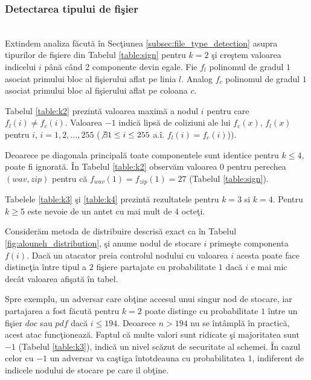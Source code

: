 \documentclass{llncs}
\begin{document}
\subsubsection{Detectarea tipului de fi\c{s}ier}\hspace*{\fill} \\

Extindem analiza f\u{a}cut\u{a} \^{i}n Sec\c{t}iunea {\ref{subsec:file_type_detection}} asupra tipurilor de fi\c{s}iere din Tabelul {\ref{table:sign}} pentru $k = 2$ \c{s}i cre\c{s}tem valoarea indicelui $i$ p\^{a}n\u{a} c\^{a}nd 2 componente devin egale. Fie $f_l$ polinomul de gradul $1$ asociat primului bloc al fi\c{s}ierului aflat pe linia $l$. Analog $f_c$ polinomul de gradul $1$ asociat primului bloc al fi\c{s}ierului aflat pe coloana $c$.

Tabelul {\ref{table:k2} prezint\u{a}} valoarea maxim\u{a} a nodul $i$ pentru care $f_l(i) \neq f_c(i)$. Valoarea $-1$ indic\u{a} lips\u{a} de coliziuni ale lui $f_c(x)$, $f_l(x)$ pentru $i$, $i = {1,2,\dots,255}$ ($\not\exists 1 \leq i \leq 255$ a.\^{i}. $f_l(i) = f_c(i)$)).

Deoarece pe diagonala principal\u{a} toate componentele sunt identice pentru $k \leq 4$, poate fi ignorat\u{a}. \^{I}n Tabelul {\ref{table:k2}} observ\u{a}m valoarea $0$ pentru perechea $(wav, zip)$ pentru c\u{a} $f_{wav}(1) = f_{zip}(1) = 27$ (Tabelul \ref{table:sign}).

Tabelele {\ref{table:k3} \c{s}i \ref{table:k4}} prezint\u{a} rezultatele pentru $k = 3$ si $k = 4$. Pentru $k \geq 5$ este nevoie de un antet cu mai mult de $4$ octe\c{t}i.

Consider\u{a}m metoda de distribuire descris\u{a} exact ca \^{i}n Tabelul {\ref{fig:alouneh_distribution}}, \c{s}i anume nodul de stocare $i$ prime\c{s}te componenta $f(i)$.
Dac\u{a} un atacator preia controlul nodului cu valoarea $i$ acesta poate face distinc\c{t}ia \^{i}ntre tipul a $2$ fi\c{s}iere partajate cu probabilitate $1$ dac\u{a} $i$ e mai mic dec\^{a}t valoarea afi\c{s}at\u{a} \^{i}n tabel.

Spre exemplu, un adversar care ob\c{t}ine accesul unui singur nod de stocare, iar partajarea a fost f\u{a}cut\u{a} pentru $k=2$ poate distinge cu probabilitate $1$ \^{i}ntre un fi\c{s}ier $doc$ sau $pdf$ dac\u{a} $i \leq 194$. Deoarece $n > 194$ nu se \^{i}nt\^{a}mpl\u{a} \^{i}n practic\u{a}, acest atac func\c{t}ioneaz\u{a}. Faptul c\u{a} multe valori sunt ridicate \c{s}i majoritatea sunt $-1$ (Tabelul \ref{table:k3}), indic\u{a} un nivel sc\u{a}zut de securitate al schemei. \^{I}n cazul celor cu $-1$ un adversar va ca\c{s}tiga \^{i}ntotdeauna cu probabilitatea $1$, indiferent de indicele nodului de stocare pe care il ob\c{t}ine.
\end{document}
